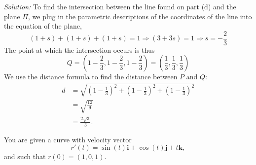 \documentclass[11pt]{exam}
\begin{document}
\begin{questions}
\begin{parts}
\textit{Solution:} To find the intersection between the line found on part (d) and the plane $\Pi$, we plug in the parametric descriptions of the coordinates of the line into the equation of the plane, 
\begin{equation*}
(1+s)+(1+s)+(1+s) = 1 \Rightarrow (3+3s)=1 \Rightarrow s = -\frac{2}{3}
\end{equation*}
The point at which the intersection occurs is thus 
\begin{equation*}
Q = \left(1-\frac{2}{3},1-\frac{2}{3},1-\frac{2}{3}\right) = \left( \frac{1}{3}, \frac{1}{3},\frac{1}{3} \right)
\end{equation*}
We use the distance formula to find the distance between $P$ and $Q$: 
\begin{align*}
d & = \sqrt{\left( 1-\frac{1}{3}\right)^2 + \left( 1-\frac{1}{3}\right)^2+ \left( 1-\frac{1}{3}\right)^2} \\
& = \sqrt{\frac{12}{9}} \\
& = \frac{2\sqrt{3}}{3}.
\end{align*}
\vfill 
\end{parts}


\newpage
\addpoints
\question You are given a curve with velocity vector 
\begin{equation*}
r'(t)= \sin(t)\mathbf{i} + \cos(t)\mathbf{j} + t \mathbf{k},
\end{equation*}
and such that $r(0)=(1,0,1)$.
\end{questions}
\end{document}
